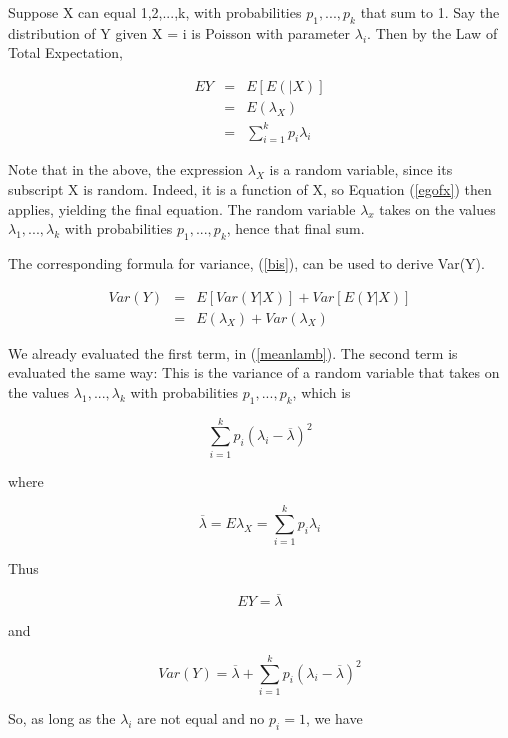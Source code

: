 Suppose X can equal 1,2,...,k, with probabilities $p_1,...,p_k$ that sum
to 1.  Say the distribution of Y given X = i is Poisson with parameter
$\lambda_i$.  Then by the Law of Total Expectation,

\begin{eqnarray}
\label{meanlamb}
EY &=& E[E(|X)] \\ 
&=& E(\lambda_X) \\
&=& \sum_{i=1}^k p_i \lambda_i
\end{eqnarray}

Note that in the above, the expression $\lambda_X$ is a random variable,
since its subscript X is random.  Indeed, it is a function of X, so
Equation (\ref{egofx}) then applies, yielding the final equation.  The
random variable $\lambda_x$ takes on the values $\lambda_1,...,\lambda_k$
with probabilities $p_1,...,p_k$, hence that final sum.

The corresponding formula for variance, (\ref{bis}), can be used to
derive Var(Y).

\begin{eqnarray}
Var(Y) &=& E[Var(Y|X)] + Var[E(Y|X)] \\ 
&=& E(\lambda_X) + Var(\lambda_X)
\end{eqnarray}

We already evaluated the first term, in (\ref{meanlamb}).  The second
term is evaluated the same way:  This is the variance of a random
variable that takes on the values $\lambda_1,...,\lambda_k$
with probabilities $p_1,...,p_k$, which is

\begin{equation}
\sum_{i=1}^k p_i (\lambda_i - \overline{\lambda})^2
\end{equation}

where 

\begin{equation}
\overline{\lambda} =  E\lambda_X = \sum_{i=1}^k p_i \lambda_i
\end{equation}

Thus

\begin{equation}
EY = \overline{\lambda}
\end{equation}

and

\begin{equation}
Var(Y) = \overline{\lambda} + 
\sum_{i=1}^k p_i (\lambda_i - \overline{\lambda})^2
\end{equation}

So, as long as the $\lambda_i$ are not equal and no $p_i = 1$, we have

